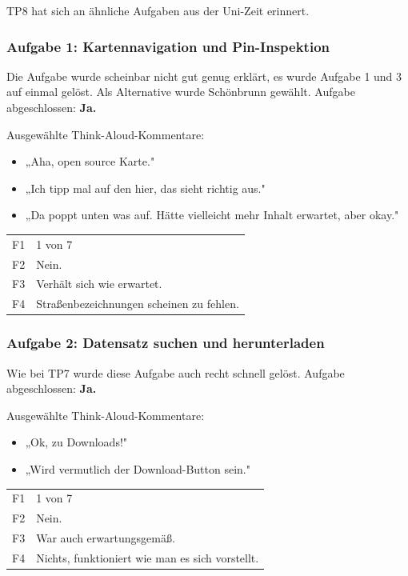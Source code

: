 \documentclass{article}
\begin{document}
TP8 hat sich an ähnliche Aufgaben aus der Uni-Zeit erinnert.

\subsubsection*{Aufgabe 1: Kartennavigation und Pin-Inspektion}

Die Aufgabe wurde scheinbar nicht gut genug erklärt, es wurde Aufgabe 1 und 3 auf einmal gelöst.
Als Alternative wurde Schönbrunn gewählt.
Aufgabe abgeschlossen: \textbf{Ja.}

\bigskip
Ausgewählte Think-Aloud-Kommentare:
\begin{itemize}
  \item „Aha, open source Karte."
  \item „Ich tipp mal auf den hier, das sieht richtig aus."
  \item „Da poppt unten was auf. Hätte vielleicht mehr Inhalt erwartet,
        aber okay."
\end{itemize}

\begin{tabular}{@{}lp{10cm}@{}}
  F1 & 1 von 7 \\
  F2 & Nein. \\
  F3 & Verhält sich wie erwartet. \\
  F4 & Straßenbezeichnungen scheinen zu fehlen. \\
\end{tabular}

\subsubsection*{Aufgabe 2: Datensatz suchen und herunterladen}

Wie bei TP7 wurde diese Aufgabe auch recht schnell gelöst.
Aufgabe abgeschlossen: \textbf{Ja.}

\bigskip
Ausgewählte Think-Aloud-Kommentare:
\begin{itemize}
  \item „Ok, zu Downloads!"
  \item „Wird vermutlich der Download-Button sein."
\end{itemize}

\begin{tabular}{@{}lp{10cm}@{}}
  F1 & 1 von 7 \\
  F2 & Nein. \\
  F3 & War auch erwartungsgemäß. \\
  F4 & Nichts, funktioniert wie man es sich vorstellt. \\
\end{tabular}
\end{document}

